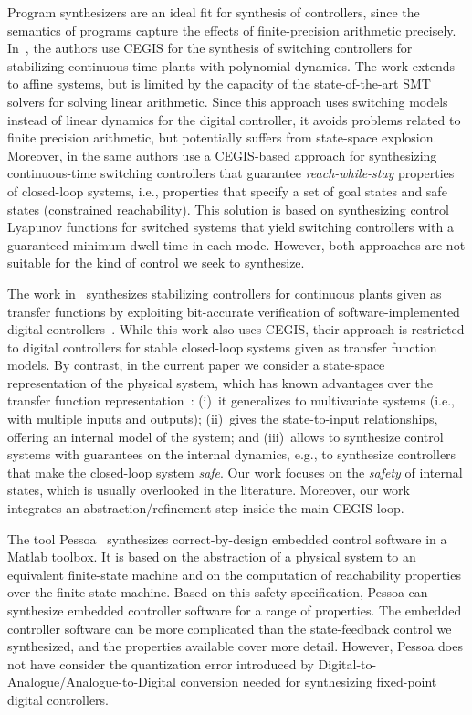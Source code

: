 \documentclass[runningheads,a4paper]{llncs}
\begin{document}
Program synthesizers are an ideal fit for synthesis of controllers, since
the semantics of programs capture the effects of finite-precision arithmetic
precisely.  In~\cite{DBLP:conf/cdc/RavanbakhshS15}, the authors use CEGIS
for the synthesis of switching controllers for stabilizing continuous-time
plants with polynomial dynamics.  The work extends to affine systems, but is
limited by the capacity of the state-of-the-art SMT solvers for solving
linear arithmetic.  Since this approach uses switching models instead of
linear dynamics for the digital controller, it avoids problems related to
finite precision arithmetic, but potentially suffers from state-space
explosion.  Moreover, in \cite{DBLP:conf/emsoft/RavanbakhshS16} the same
authors use a CEGIS-based approach for synthesizing continuous-time
switching controllers that guarantee \emph{reach-while-stay} properties of
closed-loop systems, i.e., properties that specify a set of goal states and
safe states (constrained reachability).  This solution is based on
synthesizing control Lyapunov functions for switched systems that yield
switching controllers with a guaranteed minimum dwell time in each mode. 
However, both approaches are not suitable for the kind of control we seek to
synthesize.

The work in~\cite{hscc-paper} synthesizes stabilizing
controllers for continuous plants given as transfer functions by exploiting
bit-accurate verification of software-implemented digital
controllers~\cite{IsmailBCFF15, Bessa16}.  While this work also uses CEGIS,
their approach is restricted to digital controllers for stable closed-loop
systems given as transfer function models.  By contrast, in the current
paper we consider a state-space representation of the physical system, which
has known advantages over the transfer function
representation~\cite{Astrom08}: (i)~it generalizes to multivariate systems
(i.e., with multiple inputs and outputs); (ii)~gives the state-to-input
relationships, offering an internal model of the system; and (iii)~allows to
synthesize control systems with guarantees on the internal dynamics, e.g.,
to synthesize controllers that make the closed-loop system \emph{safe}.  Our
work focuses on the \emph{safety} of internal states, which is usually
overlooked in the literature.  Moreover, our work integrates an
abstraction/refinement step inside the main CEGIS loop.

The tool Pessoa~\cite{mazo2010pessoa} synthesizes correct-by-design embedded
control software in a Matlab toolbox.  It is based on the abstraction of a
physical system to an equivalent finite-state machine and on the computation
of reachability properties over the finite-state machine.  Based on this
safety specification, \mbox{Pessoa} can synthesize embedded controller
software for a range of properties.  The embedded controller software can be
more complicated than the state-feedback control we synthesized, and the
properties available cover more detail.
%
%
However, Pessoa does not have consider the quantization error introduced by
Digital-to-Analogue/Analogue-to-Digital conversion needed for synthesizing
fixed-point digital controllers.
\end{document}
